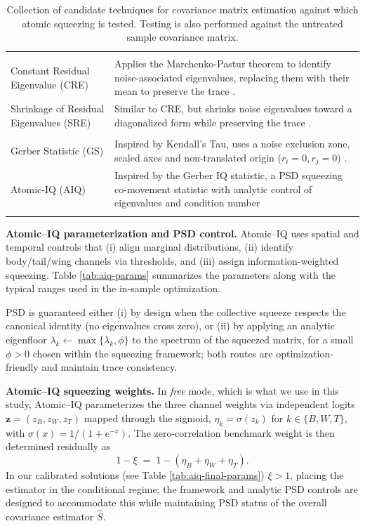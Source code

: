 \documentclass[12pt,letterpaper]{article}
\begin{document}
\begin{longtable}{>{\raggedright\arraybackslash}p{3.5cm} >{\raggedright\arraybackslash}p{10.0cm}}
\midrule
\multicolumn{2}{l}{\textbf{Random Matrix Theory}} \\
Constant Residual Eigenvalue (CRE) &
Applies the Marchenko-Pastur theorem to identify noise-associated eigenvalues, replacing them with their mean to preserve the trace \citep{de2020machine}. \\
Shrinkage of Residual Eigenvalues (SRE) &
Similar to CRE, but shrinks noise eigenvalues toward a diagonalized form while preserving the trace \citep{de2020machine}. \\

\midrule
\multicolumn{2}{l}{\textbf{Co-Movement}} \\
Gerber Statistic (GS) &
Inspired by Kendall’s Tau, uses a noise exclusion zone, scaled axes and non-translated origin (\(r_i=0,r_j =0\)) \citep{gerber2022gerber}. \\
Atomic-IQ (AIQ) &
Inspired by the Gerber IQ statistic, a PSD squeezing co-movement statistic with analytic control of eigenvalues and condition number\\
\bottomrule
\caption{Collection of candidate techniques for covariance matrix estimation against which atomic squeezing is tested. Testing is also performed against the untreated sample covariance matrix.}
\label{tab:1}
\end{longtable}
\endgroup

\vspace{0.35em}
\noindent\textbf{Atomic--IQ parameterization and PSD control.}
Atomic--IQ uses spatial and temporal controls that (i) align marginal distributions, (ii) identify body/tail/wing channels via thresholds, and (iii) assign information-weighted squeezing. Table \ref{tab:aiq-params} summarizes the parameters along with the typical ranges used in the in-sample optimization.

PSD is guaranteed either (i) by design when the collective squeeze respects the canonical identity (no eigenvalues cross zero), or (ii) by applying an analytic eigenfloor $\lambda_k\leftarrow\max\{\lambda_k,\phi\}$ to the spectrum of the squeezed matrix, for a small $\phi\!>\!0$ chosen within the squeezing framework; both routes are optimization-friendly and maintain trace consistency.

\medskip
\noindent\textbf{Atomic--IQ squeezing weights.}
In \emph{free} mode, which is what we use in this study, Atomic--IQ parameterizes the three channel weights via independent logits $\mathbf z=(z_B,z_W,z_T)$ mapped through the sigmoid, $\eta_k=\sigma(z_k)$ for $k\in\{B,W,T\}$, with $\sigma(x)=1/(1+e^{-x})$. The zero-correlation benchmark weight is then determined residually as
\[
1-\xi \;=\; 1 - (\eta_B+\eta_W+\eta_T).
\]
In our calibrated solutions (see Table \ref{tab:aiq-final-params}) $\xi>1$, placing the estimator in the conditional regime; the framework and analytic PSD controls are designed to accommodate this while maintaining PSD status of the overall covariance estimator $\hat{S}$.
\end{document}

